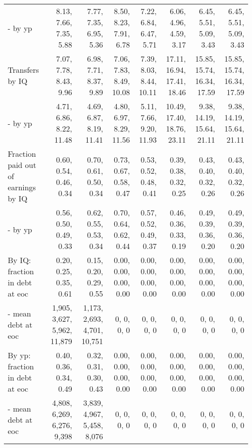 \begin{tabular}{lrrrrrrr}
- by yp & 8.13, 7.66, 7.35, 5.88  & 7.77, 7.35, 6.95, 5.36  & 8.50, 8.23, 7.91, 6.78  & 7.22, 6.84, 6.47, 5.71  & 6.06, 4.96, 4.59, 3.17  & 6.45, 5.51, 5.09, 3.43  & 6.45, 5.51, 5.09, 3.43  \\ 
Transfers by IQ & 7.07, 7.78, 8.43, 9.96  & 6.98, 7.71, 8.37, 9.89  & 7.06, 7.83, 8.49, 10.08  & 7.39, 8.03, 8.44, 10.11  & 17.11, 16.94, 17.41, 18.46  & 15.85, 15.74, 16.34, 17.59  & 15.85, 15.74, 16.34, 17.59  \\ 
- by yp & 4.71, 6.86, 8.22, 11.48  & 4.69, 6.87, 8.19, 11.41  & 4.80, 6.97, 8.29, 11.56  & 5.11, 7.66, 9.20, 11.93  & 10.49, 17.40, 18.76, 23.11  & 9.38, 14.19, 15.64, 21.11  & 9.38, 14.19, 15.64, 21.11  \\ 
Fraction paid out of earnings by IQ & 0.60, 0.54, 0.46, 0.34  & 0.70, 0.61, 0.50, 0.34  & 0.73, 0.67, 0.58, 0.47  & 0.53, 0.52, 0.48, 0.41  & 0.39, 0.38, 0.32, 0.25  & 0.43, 0.40, 0.32, 0.26  & 0.43, 0.40, 0.32, 0.26  \\ 
- by yp & 0.56, 0.50, 0.49, 0.33  & 0.62, 0.55, 0.53, 0.34  & 0.70, 0.64, 0.62, 0.44  & 0.57, 0.52, 0.49, 0.37  & 0.46, 0.36, 0.33, 0.19  & 0.49, 0.39, 0.36, 0.20  & 0.49, 0.39, 0.36, 0.20  \\ 
By IQ: fraction in debt at eoc & 0.20, 0.25, 0.35, 0.61  & 0.15, 0.20, 0.29, 0.55  & 0.00, 0.00, 0.00, 0.00  & 0.00, 0.00, 0.00, 0.00  & 0.00, 0.00, 0.00, 0.00  & 0.00, 0.00, 0.00, 0.00  & 0.00, 0.00, 0.00, 0.00  \\ 
- mean debt at eoc & 1,905, 3,627, 5,962, 11,879  & 1,173, 2,693, 4,701, 10,751  & 0, 0, 0, 0  & 0, 0, 0, 0  & 0, 0, 0, 0  & 0, 0, 0, 0  & 0, 0, 0, 0  \\ 
By yp: fraction in debt at eoc & 0.40, 0.36, 0.34, 0.49  & 0.32, 0.31, 0.30, 0.43  & 0.00, 0.00, 0.00, 0.00  & 0.00, 0.00, 0.00, 0.00  & 0.00, 0.00, 0.00, 0.00  & 0.00, 0.00, 0.00, 0.00  & 0.00, 0.00, 0.00, 0.00  \\ 
- mean debt at eoc & 4,808, 6,269, 6,276, 9,398  & 3,839, 4,967, 5,458, 8,076  & 0, 0, 0, 0  & 0, 0, 0, 0  & 0, 0, 0, 0  & 0, 0, 0, 0  & 0, 0, 0, 0  \\ 
\hline
\end{tabular}%
